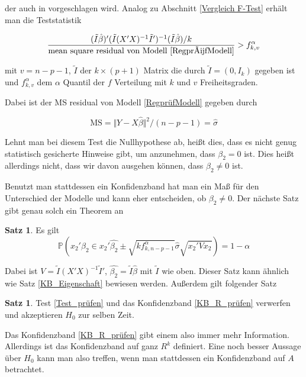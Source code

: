 \documentclass[12pt,a4paper]{article}
\theoremstyle{definition}
\theoremstyle{definition}
\newtheorem{Satz}[Definition]{Satz}
\theoremstyle{definition}
\theoremstyle{definition}
\begin{document}
der auch in \cite{Draper98} vorgeschlagen wird. Analog zu Abschnitt \ref{Vergleich F-Test} erhält man die Teststatistik

\begin{equation*}
\frac{(\tilde{I}\hat{\beta})'(\tilde{I}(X'X)^{-1}\tilde{I}')^{-1}(\tilde{I}\hat{\beta})/k}{\text{mean square residual von Modell \ref{RegprüfModell}}} > f^{\alpha}_{k,v}
\end{equation*}

mit $v=n-p-1$, $\tilde{I}$ der $k \times (p+1)$ Matrix die durch $\tilde{I}=(0,I_k)$ gegeben ist und $f^{\alpha}_{k,v}$ dem $\alpha$ Quantil der $f$ Verteilung mit $k$ und $v$ Freiheitsgraden.

Dabei ist der MS residual von Modell \eqref{RegprüfModell} gegeben durch

\begin{equation*}
\text{MS} = \Vert Y - X\hat{\beta} \Vert^2 / (n-p-1) = \hat{\sigma}
\end{equation*}

Lehnt man bei diesem Test die Nullhypothese ab, heißt dies, dass es nicht genug statistisch gesicherte Hinweise gibt, um anzunehmen, dass $\beta_{2} = 0$ ist. Dies heißt allerdings nicht, dass wir davon ausgehen können, dass $\beta_2 \neq 0$ ist. 

Benutzt man stattdessen ein Konfidenzband hat man ein Maß für den Unterschied der Modelle und kann eher entscheiden, ob $\beta_2 \neq 0$. Der nächste Satz gibt genau solch ein Theorem an

\begin{Satz}
Es gilt
\begin{equation} \label{KB_R_prüfen}
\mathbb{P}(x_2'\beta_2 \in x_2'\hat{\beta_2} \pm \sqrt{k f^{\alpha}_{k,n-p-1}} \hat{\sigma} \sqrt{x_2' V x_2}) = 1 - \alpha
\end{equation}
\end{Satz}

Dabei ist $V=\tilde{I}(X'X)^{-1}\tilde{I}'$, $\hat{\beta_2} = \tilde{I} \hat{\beta}$ mit $\tilde{I}$ wie oben. Dieser Satz kann ähnlich wie Satz \eqref{KB_Eigenschaft} bewiesen werden. Außerdem gilt folgender Satz

\begin{Satz}
Test \eqref{Test_prüfen} und das Konfidenzband \eqref{KB_R_prüfen} verwerfen und akzeptieren $H_0$ zur selben Zeit.
\end{Satz}

Das Konfidenzband \eqref{KB_R_prüfen} gibt einem also immer mehr Information. Allerdings ist das Konfidenzband auf ganz $R^k$ definiert. Eine noch besser Aussage über $H_0$ kann man also treffen, wenn man stattdessen ein Konfidenzband auf $A$ betrachtet. 
\end{document}

